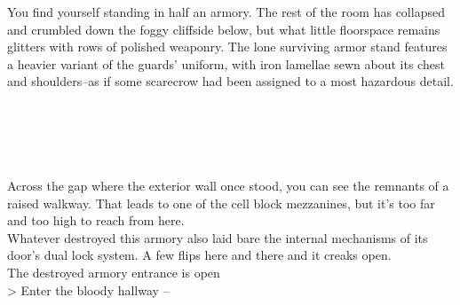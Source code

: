 You find yourself standing in half an armory. The rest of the room has collapsed and crumbled down the foggy cliffside below, but what little floorspace remains glitters with rows of polished weaponry. The lone surviving armor stand features a heavier variant of the guards' uniform, with iron lamellae sewn about its chest and shoulders--as if some scarecrow had been assigned to a most hazardous detail.\\
\\
\\
\\
\\
\\

Across the gap where the exterior wall once stood, you can see the remnants of a raised walkway. That leads to one of the cell block mezzanines, but it's too far and too high to reach from here.\\

Whatever destroyed this armory also laid bare the internal mechanisms of its door's dual lock system. A few flips here and there and it creaks open.\\
 The destroyed armory entrance is open\\

> Enter the bloody hallway -- 